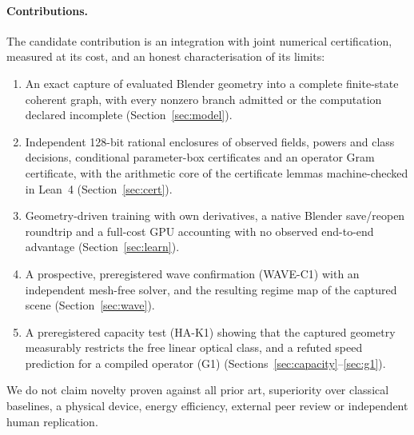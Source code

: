 \documentclass[11pt,a4paper]{article}
\begin{document}
\paragraph{Contributions.}
The candidate contribution is an integration with joint numerical certification, measured at its cost, and an honest characterisation of its limits:
\begin{enumerate}[label=(\roman*)]
  \item An exact capture of evaluated Blender geometry into a complete finite-state coherent graph, with every nonzero branch admitted or the computation declared incomplete (Section~\ref{sec:model}).
  \item Independent 128-bit rational enclosures of observed fields, powers and class decisions, conditional parameter-box certificates and an operator Gram certificate, with the arithmetic core of the certificate lemmas machine-checked in Lean~4 (Section~\ref{sec:cert}).
  \item Geometry-driven training with own derivatives, a native Blender save/reopen roundtrip and a full-cost GPU accounting with no observed end-to-end advantage (Section~\ref{sec:learn}).
  \item A prospective, preregistered wave confirmation (WAVE-C1) with an independent mesh-free solver, and the resulting regime map of the captured scene (Section~\ref{sec:wave}).
  \item A preregistered capacity test (HA-K1) showing that the captured geometry measurably restricts the free linear optical class, and a refuted speed prediction for a compiled operator (G1) (Sections~\ref{sec:capacity}--\ref{sec:g1}).
\end{enumerate}
We do not claim novelty proven against all prior art, superiority over classical baselines, a physical device, energy efficiency, external peer review or independent human replication.
\end{document}
